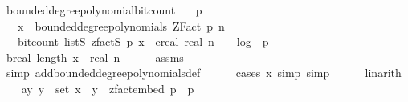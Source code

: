 \begin{isabellebody}
%
\endisadelimproof
\isanewline
{}\isamarkupfalse%
\ bounded{\isacharunderscore}{\kern0pt}degree{\isacharunderscore}{\kern0pt}polynomial{\isacharunderscore}{\kern0pt}bit{\isacharunderscore}{\kern0pt}count{\isacharcolon}{\kern0pt}\isanewline
\ \ \ {\isachardoublequoteopen}p\ {\isachargreater}{\kern0pt}\ {}{\isachardoublequoteclose}\isanewline
\ \ \ {\isachardoublequoteopen}x\ {\isasymin}\ bounded{\isacharunderscore}{\kern0pt}degree{\isacharunderscore}{\kern0pt}polynomials\ {\isacharparenleft}{\kern0pt}ZFact\ p{\isacharparenright}{\kern0pt}\ n{\isachardoublequoteclose}\isanewline
\ \ \ {\isachardoublequoteopen}bit{\isacharunderscore}{\kern0pt}count\ {\isacharparenleft}{\kern0pt}list\isactrlsub S\ {\isacharparenleft}{\kern0pt}zfact\isactrlsub S\ p{\isacharparenright}{\kern0pt}\ x{\isacharparenright}{\kern0pt}\ {\isasymle}\ ereal\ {\isacharparenleft}{\kern0pt}real\ n\ {\isacharasterisk}{\kern0pt}\ {\isacharparenleft}{\kern0pt}{}\ {\isacharasterisk}{\kern0pt}\ log\ {}\ p\ {\isacharplus}{\kern0pt}\ {}{\isacharparenright}{\kern0pt}\ {\isacharplus}{\kern0pt}\ {}{\isacharparenright}{\kern0pt}{\isachardoublequoteclose}\isanewline
%
\isadelimproof
%
\endisadelimproof
%
\isatagproof
{}\isamarkupfalse%
\ {\isacharminus}{\kern0pt}\isanewline
\ \ \isamarkupfalse%
\ b{\isacharcolon}{\kern0pt}{\isachardoublequoteopen}real\ {\isacharparenleft}{\kern0pt}length\ x{\isacharparenright}{\kern0pt}\ {\isasymle}\ real\ n{\isachardoublequoteclose}\isanewline
\ \ \ \ \isamarkupfalse%
\ assms{\isacharparenleft}{\kern0pt}{}{\isacharparenright}{\kern0pt}\ \isanewline
\ \ \ \ \isamarkupfalse%
\ {\isacharparenleft}{\kern0pt}simp\ add{\isacharcolon}{\kern0pt}bounded{\isacharunderscore}{\kern0pt}degree{\isacharunderscore}{\kern0pt}polynomials{\isacharunderscore}{\kern0pt}def{\isacharparenright}{\kern0pt}\isanewline
\ \ \ \ \isamarkupfalse%
\ {\isacharparenleft}{\kern0pt}cases\ {\isachardoublequoteopen}x{\isacharequal}{\kern0pt}{\isacharbrackleft}{\kern0pt}{\isacharbrackright}{\kern0pt}{\isachardoublequoteclose}{\isacharcomma}{\kern0pt}\ simp{\isacharcomma}{\kern0pt}\ simp{\isacharparenright}{\kern0pt}\isanewline
\ \ \ \ \isamarkupfalse%
\ linarith\isanewline
\isanewline
\ \ \isamarkupfalse%
\ a{\isacharcolon}{\kern0pt}{\isachardoublequoteopen}{\isasymAnd}y{\isachardot}{\kern0pt}\ y\ {\isasymin}\ set\ x\ {\isasymLongrightarrow}\ y\ {\isasymin}\ zfact{\isacharunderscore}{\kern0pt}embed\ p\ {\isacharbackquote}{\kern0pt}\ {\isacharbraceleft}{\kern0pt}{}{\isachardot}{\kern0pt}{\isachardot}{\kern0pt}{\isacharless}{\kern0pt}p{\isacharbraceright}{\kern0pt}{\isachardoublequoteclose}\ \isanewline

\end{isabellebody}
